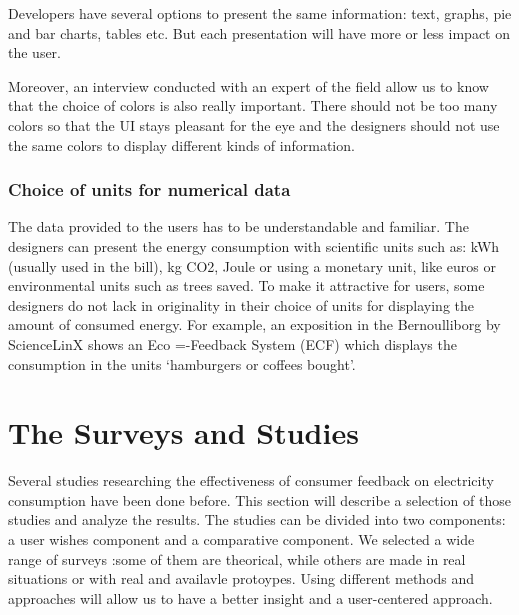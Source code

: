 \documentclass[journal]{vgtc}                %
\begin{document}
Developers have several options to present the same information: text, graphs, pie and bar charts, tables etc. But each presentation will have more or less impact on the user.

Moreover, an interview conducted with an expert of the field allow us to know that the choice of colors is also really important. There should not be too many colors so that the UI stays pleasant for the eye and the designers should not use the same colors to display different kinds of information.

\subsubsection{Choice of units for numerical data}
The data provided to the users has to be understandable and familiar. The designers can present the energy consumption with scientific units such as: kWh (usually used in the bill), kg CO2, Joule or using a monetary unit, like euros or environmental units such as trees saved.
To make it attractive for users, some designers do not lack in originality in their choice of units for displaying the amount of consumed energy. For example, an exposition in the Bernoulliborg by ScienceLinX shows an Eco =-Feedback System (ECF) which displays the consumption in the units ‘hamburgers or coffees bought’.


\section{The Surveys and Studies}
Several studies researching the effectiveness of consumer feedback on electricity consumption have been done before.
This section will describe a selection of those studies and analyze the results.
The studies can be divided into two components: a user wishes component and a comparative component.
We selected a wide range of surveys :some of them are theorical, while others are made in real situations or with real and availavle protoypes. Using different methods and approaches will allow us to have a better insight and a user-centered approach.
\end{document}
